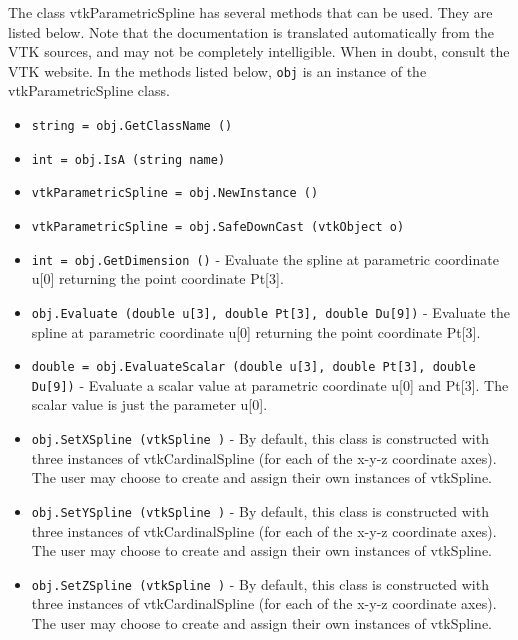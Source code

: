 The class vtkParametricSpline has several methods that can be used.
  They are listed below.
Note that the documentation is translated automatically from the VTK sources,
and may not be completely intelligible.  When in doubt, consult the VTK website.
In the methods listed below, \verb|obj| is an instance of the vtkParametricSpline class.
\begin{itemize}
\item  \verb|string = obj.GetClassName ()|

\item  \verb|int = obj.IsA (string name)|

\item  \verb|vtkParametricSpline = obj.NewInstance ()|

\item  \verb|vtkParametricSpline = obj.SafeDownCast (vtkObject o)|

\item  \verb|int = obj.GetDimension ()| -  Evaluate the spline at parametric coordinate u[0] returning
 the point coordinate Pt[3].

\item  \verb|obj.Evaluate (double u[3], double Pt[3], double Du[9])| -  Evaluate the spline at parametric coordinate u[0] returning
 the point coordinate Pt[3].

\item  \verb|double = obj.EvaluateScalar (double u[3], double Pt[3], double Du[9])| -  Evaluate a scalar value at parametric coordinate u[0] and Pt[3].
 The scalar value is just the parameter u[0].

\item  \verb|obj.SetXSpline (vtkSpline )| -  By default, this class is constructed with three instances of
 vtkCardinalSpline (for each of the x-y-z coordinate axes). The user may
 choose to create and assign their own instances of vtkSpline.

\item  \verb|obj.SetYSpline (vtkSpline )| -  By default, this class is constructed with three instances of
 vtkCardinalSpline (for each of the x-y-z coordinate axes). The user may
 choose to create and assign their own instances of vtkSpline.

\item  \verb|obj.SetZSpline (vtkSpline )| -  By default, this class is constructed with three instances of
 vtkCardinalSpline (for each of the x-y-z coordinate axes). The user may
 choose to create and assign their own instances of vtkSpline.


\end{itemize}
